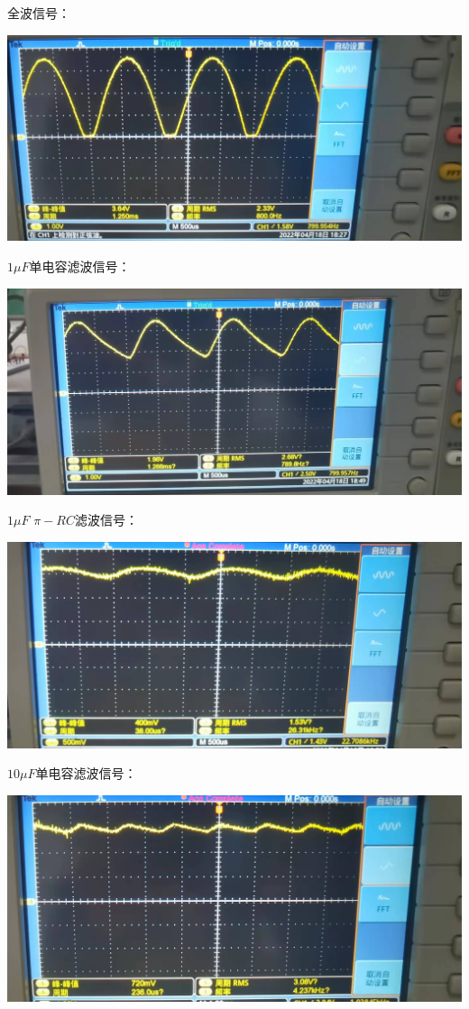 \documentclass[a4paper]{ltxdoc}
\newenvironment{Figure}
{\par\medskip\noindent\minipage{\linewidth}}
{\endminipage\par\medskip}
\begin{document}
\begin{multicols}{2}
    全波信号：
    \begin{Figure}
        \centering
        \includegraphics[width=0.7\linewidth]{img/original/5.jpg}
    \end{Figure}

    $1\mu F$单电容滤波信号：
    \begin{Figure}
        \centering
        \includegraphics[width=0.7\linewidth]{img/original/9.jpg}
    \end{Figure}

    $1\mu F$ $\pi - RC$滤波信号：
    \begin{Figure}
        \centering
        \includegraphics[width=0.7\linewidth]{img/original/10.jpg}
    \end{Figure}

    $10\mu F$单电容滤波信号：
    \begin{Figure}
        \centering
        \includegraphics[width=0.7\linewidth]{img/original/7.jpg}
    \end{Figure}


\end{multicols}
\end{document}

